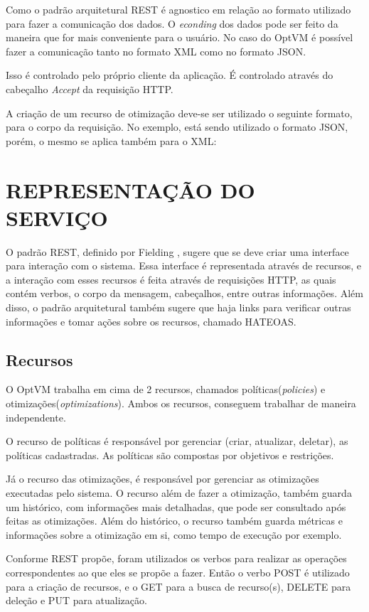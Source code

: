 Como o padrão arquitetural REST é agnostico em relação ao formato utilizado para fazer a comunicação dos dados. O \textit{econding} 
dos dados pode ser feito da maneira que for mais conveniente para o usuário. No caso do OptVM é possível fazer a comunicação
tanto no formato XML como no formato JSON.

Isso é controlado pelo próprio cliente da aplicação. É controlado através do cabeçalho \textit{Accept}
da requisição HTTP.

A criação de um recurso de otimização deve-se ser utilizado o seguinte formato, para o corpo da requisição. No exemplo, está sendo
utilizado o formato JSON, porém, o mesmo se aplica também para o XML:

\section{REPRESENTAÇÃO DO SERVIÇO}

O padrão REST, definido por Fielding \cite{fielding}, sugere que se deve criar uma interface para interação com o sistema. 
Essa interface é representada através de recursos, e a interação com esses recursos é feita através de requisições HTTP, 
as quais contém verbos, o corpo da mensagem, cabeçalhos, entre outras informações. Além disso, o padrão arquitetural também sugere que 
haja links para verificar outras informações e tomar ações sobre os recursos, chamado HATEOAS.

\subsection{Recursos}

O OptVM trabalha em cima de 2 recursos, chamados políticas(\textit{policies}) e otimizações(\textit{optimizations}). 
Ambos os recursos, conseguem trabalhar de maneira independente.

O recurso de políticas é responsável por gerenciar (criar, atualizar, deletar), as políticas
cadastradas. As políticas são compostas por objetivos e restrições. 

Já o recurso das otimizações, é responsável por gerenciar as otimizações executadas pelo sistema. O recurso 
além de fazer a otimização, também guarda um histórico, com informações mais detalhadas, 
que pode ser consultado após feitas as otimizações. Além do histórico, o recurso também guarda métricas e informações sobre
a otimização em si, como tempo de execução por exemplo.

Conforme REST propõe, foram utilizados os verbos para realizar as operações correspondentes
ao que eles se propõe a fazer. Então o verbo POST é utilizado para a criação de recursos,
e o GET para a busca de recurso(s), DELETE para deleção e PUT para atualização.

